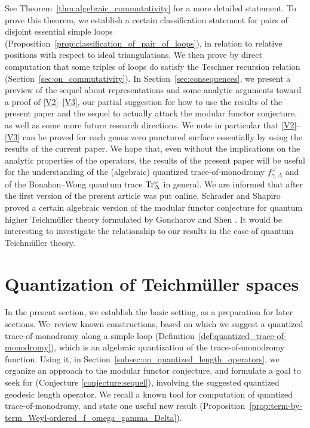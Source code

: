 \documentclass[10pt,a4paper]{amsart}
\numberwithin{equation}{section}
\theoremstyle{definition}
\begin{document}
See Theorem~\ref{thm:algebraic_commutativity} for a more detailed statement. To prove this theorem, we establish a certain classification statement for pairs of disjoint essential simple loops (Proposition~\ref{prop:classification_of_pair_of_loops}), in relation to relative positions with respect to ideal triangulations. We then prove by direct computation that some triples of loops do satisfy the Teschner recursion relation (Section~\ref{sec:on_commutativity}).
In Section~\ref{sec:consequences}, we present a preview of the sequel \cite{sequel} about representations and some analytic arguments toward a proof of \ref{V2}--\ref{V3}, our partial suggestion for how to use the results of the present paper and the sequel \cite{sequel} to actually attack the modular functor conjecture, as well as some more future research directions. We note in particular that \ref{V2}--\ref{V3} can be proved for each genus zero punctured surface essentially by using the results of the current paper.
We hope that, even without the implications on the analytic properties of the operators, the results of the present paper will be useful for the understanding of the (algebraic) quantized trace-of-monodromy $f^\omega_{\gamma,\Delta}$ and of the Bonahon--Wong quantum trace ${\rm Tr}^\omega_\Delta$ in general.
We are informed that after the first version of the present article was put online, Schrader and Shapiro \cite{SS25} proved a certain algebraic version of the modular functor conjecture for quantum higher Teichm\"uller theory formulated by Goncharov and Shen \cite{GS19}. It would be interesting to investigate the relationship to our results in the case of quantum Teichm\"uller theory.
\section{Quantization of Teichm\"uller spaces}
In the present section, we establish the basic setting, as a preparation for later sections. We~review known constructions, based on which we suggest a quantized trace-of-monodromy along a simple loop (Definition~\ref{def:quantized_trace-of-monodromy}), which is an algebraic quantization of the trace-of-monodromy function. Using it, in Section~\ref{subsec:on_quantized_length_operators}, we organize an approach to the modular functor conjecture, and formulate a goal to seek for (Conjecture \ref{conjecture:sequel}), involving the suggested quantized geodesic length operator. We recall a known tool for computation of quantized trace-of-monodromy, and state one useful new result (Proposition~\ref{prop:term-by-term_Weyl-ordered_f_omega_gamma_Delta}).
\end{document}

